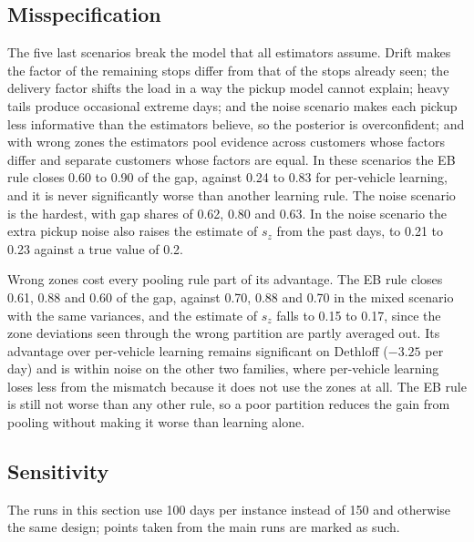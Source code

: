 \documentclass[preprint,authoryear,12pt]{elsarticle}
\begin{document}
\subsection{Misspecification}

The five last scenarios break the model that all estimators assume.
Drift makes the factor of the remaining stops differ from that of the
stops already seen; the delivery factor shifts the load in a way the
pickup model cannot explain; heavy tails produce occasional extreme
days; and the noise scenario makes each pickup less informative than
the estimators believe, so the posterior is overconfident; and with
wrong zones the estimators pool evidence across customers whose factors
differ and separate customers whose factors are equal. In these
scenarios the EB rule closes 0.60 to 0.90 of the gap, against 0.24 to
0.83 for per-vehicle learning, and it is never significantly worse than
another learning rule. The noise
scenario is the hardest, with gap shares of 0.62, 0.80 and 0.63. In the noise
scenario the extra pickup noise also raises the estimate of $s_z$ from
the past days, to 0.21 to 0.23 against a true value of 0.2.

Wrong zones cost every pooling rule part of its advantage. The EB rule
closes 0.61, 0.88 and 0.60 of the gap, against 0.70, 0.88 and 0.70 in
the mixed scenario with the same variances, and the estimate of $s_z$
falls to 0.15 to 0.17, since the zone deviations seen through the wrong
partition are partly averaged out. Its advantage over per-vehicle
learning remains significant on Dethloff ($-3.25$ per day) and is
within noise on the other two families, where per-vehicle learning
loses less from the mismatch because it does not use the zones at all.
The EB rule is still not worse than any other rule, so a poor partition
reduces the gain from pooling without making it worse than learning alone.

\subsection{Sensitivity}\label{sec:sens}

The runs in this section use 100 days per instance instead of 150 and
otherwise the same design; points taken from the main runs are marked
as such.
\end{document}
